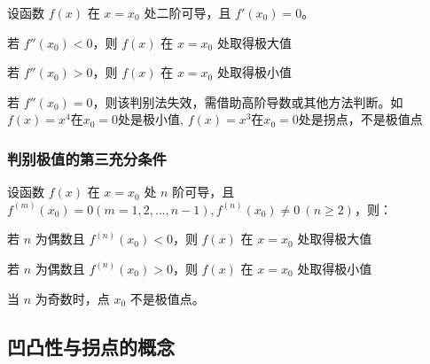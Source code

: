 \documentclass[../book.tex]{subfiles}
\begin{document}
    \begin{theorem}
        设函数 $f(x)$ 在 $x=x_0$ 处二阶可导，且 $f'(x_0)=0$。
        \begin{circlenum}
            \item 若 $f''(x_0)<0$，则 $f(x)$ 在 $x=x_0$ 处取得极大值
            \item 若 $f''(x_0)>0$，则 $f(x)$ 在 $x=x_0$ 处取得极小值
            \item 若 $f''(x_0)=0$，则该判别法失效，需借助高阶导数或其他方法判断。如$f(x) = x^4$在$x_0 = 0$处是极小值, $f(x) = x^3$在$x_0 = 0$处是拐点，不是极值点
        \end{circlenum}
    \end{theorem}

    \subsubsection{判别极值的第三充分条件}

    \begin{theorem}
        设函数 $f(x)$ 在 $x=x_0$ 处 $n$ 阶可导，且$f^{(m)}(x_0)=0 (m=1,2,\ldots,n-1), f^{(n)}(x_0)\neq 0 \ (n\ge 2)$，则：
        \begin{circlenum}
            \item 若 $n$ 为偶数且 $f^{(n)}(x_0)<0$，则 $f(x)$ 在 $x=x_0$ 处取得极大值
            \item 若 $n$ 为偶数且 $f^{(n)}(x_0)>0$，则 $f(x)$ 在 $x=x_0$ 处取得极小值
        \end{circlenum}
        当 $n$ 为奇数时，点 $x_0$ 不是极值点。
    \end{theorem}

    \subsection{凹凸性与拐点的概念}
\end{document}
